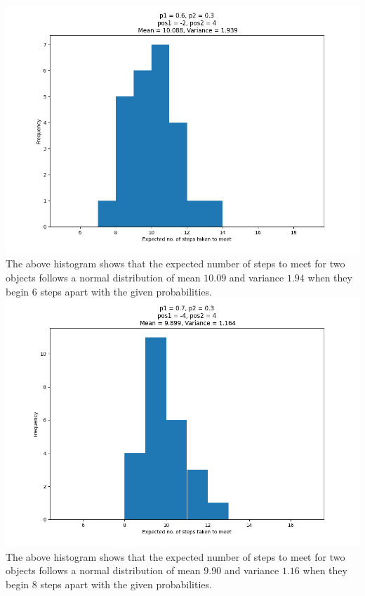 \documentclass[answers]{exam}
\begin{document}
\centering
\includegraphics[scale = 0.5]{Q1_histograms/1.3/Q1.3 _p1 = 0.6_p2 = 0.3_pos1 = -2_pos2 = 4.png}\\

The above histogram shows that the expected number of steps to meet for two objects follows a normal distribution of mean $10.09$ and variance $1.94$ when they begin 6 steps apart with the given probabilities. \\
\includegraphics[scale = 0.5]{Q1_histograms/1.3/Q1.3 _p1 = 0.7_p2 = 0.3_pos1 = -4_pos2 = 4.png} \\
The above histogram shows that the expected number of steps to meet for two objects follows a normal distribution of mean $9.90$ and variance $1.16$ when they begin 8 steps apart with the given probabilities. \\

\end{document}
